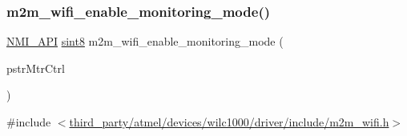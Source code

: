 \subsubsection{\texorpdfstring{m2m\+\_\+wifi\+\_\+enable\+\_\+monitoring\+\_\+mode()}{m2m\_wifi\_enable\_monitoring\_mode()}}
{\footnotesize\ttfamily \hyperlink{group__BSPDefine_gaecc0323d771e41ef81a76b5f12783e22}{N\+M\+I\+\_\+\+A\+PI} \hyperlink{group__DataT_gae35f10ffd0ac8dd2bc3e794da9bdfbc7}{sint8} m2m\+\_\+wifi\+\_\+enable\+\_\+monitoring\+\_\+mode (\begin{DoxyParamCaption}\item[{\hyperlink{structtstrM2MWifiMonitorModeCtrl}{tstr\+M2\+M\+Wifi\+Monitor\+Mode\+Ctrl} $\ast$}]{pstr\+Mtr\+Ctrl }\end{DoxyParamCaption})}



{\ttfamily \#include $<$\hyperlink{m2m__wifi_8h}{third\+\_\+party/atmel/devices/wilc1000/driver/include/m2m\+\_\+wifi.\+h}$>$}


